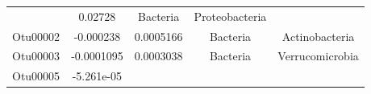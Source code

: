 \documentclass[]{article}
\begin{document}
\begin{longtable}[]{@{}ccccc@{}}
\begin{minipage}[t]{0.16\columnwidth}
\end{minipage} & \begin{minipage}[t]{0.14\columnwidth}\centering\strut
0.02728\strut
\end{minipage} & \begin{minipage}[t]{0.13\columnwidth}\centering\strut
Bacteria\strut
\end{minipage} & \begin{minipage}[t]{0.20\columnwidth}\centering\strut
Proteobacteria\strut
\end{minipage}\tabularnewline
\begin{minipage}[t]{0.13\columnwidth}\centering\strut
Otu00002\strut
\end{minipage} & \begin{minipage}[t]{0.16\columnwidth}\centering\strut
-0.000238\strut
\end{minipage} & \begin{minipage}[t]{0.14\columnwidth}\centering\strut
0.0005166\strut
\end{minipage} & \begin{minipage}[t]{0.13\columnwidth}\centering\strut
Bacteria\strut
\end{minipage} & \begin{minipage}[t]{0.20\columnwidth}\centering\strut
Actinobacteria\strut
\end{minipage}\tabularnewline
\begin{minipage}[t]{0.13\columnwidth}\centering\strut
Otu00003\strut
\end{minipage} & \begin{minipage}[t]{0.16\columnwidth}\centering\strut
-0.0001095\strut
\end{minipage} & \begin{minipage}[t]{0.14\columnwidth}\centering\strut
0.0003038\strut
\end{minipage} & \begin{minipage}[t]{0.13\columnwidth}\centering\strut
Bacteria\strut
\end{minipage} & \begin{minipage}[t]{0.20\columnwidth}\centering\strut
Verrucomicrobia\strut
\end{minipage}\tabularnewline
\begin{minipage}[t]{0.13\columnwidth}\centering\strut
Otu00005\strut
\end{minipage} & \begin{minipage}[t]{0.16\columnwidth}\centering\strut
-5.261e-05\strut
\end{minipage} & \begin{minipage}[t]{0.14\columnwidth}\centering\strut

\end{minipage}
\end{longtable}
\end{document}
